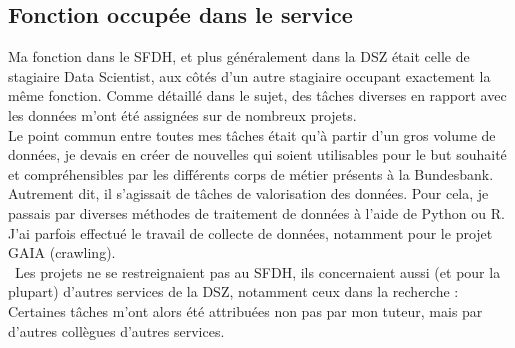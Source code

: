 \pagebreak

\subsection{Fonction occupée dans le service}

Ma fonction dans le SFDH, et plus généralement dans la DSZ était celle de stagiaire Data Scientist, aux côtés d'un autre stagiaire occupant exactement la même fonction.
Comme détaillé dans le sujet, des tâches diverses en rapport avec les données m'ont été assignées sur de nombreux projets.
\\

Le point commun entre toutes mes tâches était qu'à partir d'un gros volume de données, je devais en créer de nouvelles qui soient utilisables pour le but souhaité et compréhensibles par les différents corps de métier présents à la Bundesbank.
Autrement dit, il s'agissait de tâches de valorisation des données. Pour cela, je passais par diverses méthodes de traitement de données à l'aide de Python ou R.
J'ai parfois effectué le travail de collecte de données, notamment pour le projet GAIA (crawling).
\\

~Les projets ne se restreignaient pas au SFDH, ils concernaient aussi (et pour la plupart) d'autres services de la DSZ, notamment ceux dans la recherche :
Certaines tâches m'ont alors été attribuées non pas par mon tuteur, mais par d'autres collègues d'autres services.